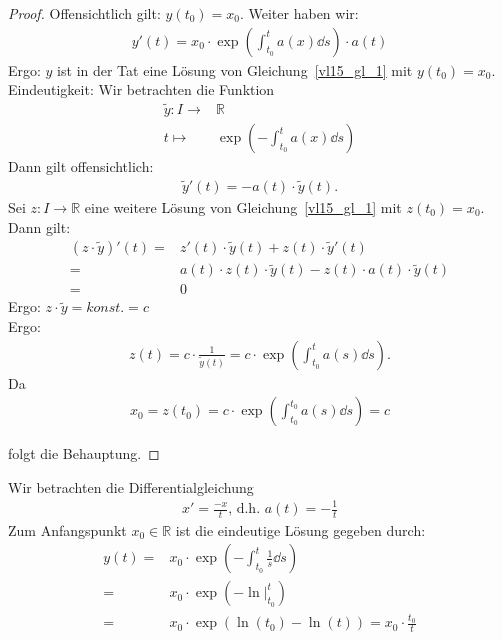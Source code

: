 \begin{proof}
	Offensichtlich gilt: $y(t_0) = x_0$. Weiter haben wir:
	\begin{align*}
		y'(t) = x_0 \cdot \exp\left( \int_{t_0}^t a(x) \dd{s} \right) \cdot a(t)
	\end{align*}
	Ergo: $y$ ist in der Tat eine Lösung von Gleichung~\ref{vl15_gl_1} mit 
	$y(t_0) = x_0$. \\
	Eindeutigkeit: Wir betrachten die Funktion 
	\begin{align*}
		\tilde{y} : I \rightarrow & \mathbb{R} \\
		t \mapsto & \exp\left(-\int_{t_0}^t a(x) \dd{s}\right)
	\end{align*}
	Dann gilt offensichtlich:
	\begin{align*}
		\tilde{y}'(t) = -a(t) \cdot \tilde{y}(t).
	\end{align*}
	Sei $z: I \rightarrow \mathbb{R}$ eine weitere Lösung von 
	Gleichung~\ref{vl15_gl_1} mit $z(t_0) = x_0$. Dann gilt:
	\begin{align*}
		(z \cdot \tilde{y})'(t) = & z'(t) \cdot \tilde{y}(t)
		+ z(t) \cdot \tilde{y}'(t) \\
		= & a(t) \cdot z(t) \cdot \tilde{y}(t) - z(t) \cdot a(t) \cdot \tilde{y}(t) \\
		= & 0
	\end{align*}
	Ergo: $z \cdot \tilde{y} = konst. = c$ \\
	Ergo: 
	\begin{align*}
		z(t) = c \cdot \frac{1}{\tilde{y}(t)} = c \cdot \exp\left( \int_{t_0}^t a(s) 
			\dd{s}\right). 
	\end{align*}
	Da
	\begin{align*}
		x_0 = z(t_0) = c \cdot \exp\left(\int_{t_0}^{t_0}a(s) \dd{s}\right) = c
	\end{align*}

	folgt die Behauptung.
\end{proof}

\begin{Beispiel}{
	Wir betrachten die Differentialgleichung
	\begin{align*}
		x' = \frac{-x}{t}\text{, d.h. } a(t) = -\frac{1}{t}
	\end{align*}
	Zum Anfangspunkt $x_0 \in \mathbb{R}$ ist die eindeutige Lösung gegeben durch:
	\begin{align*}
		y(t) = & x_0 \cdot \exp\left( - \int_{t_0}^t \frac{1}{s} \dd{s} \right) \\ 
		= & x_0 \cdot \exp \left( -\ln\vert_{t_0}^t\right) \\
		= & x_0 \cdot \exp \left( \ln(t_0) - \ln(t)\right) = x_0 \cdot \frac{t_0}{t}
	\end{align*}
}\end{Beispiel}

